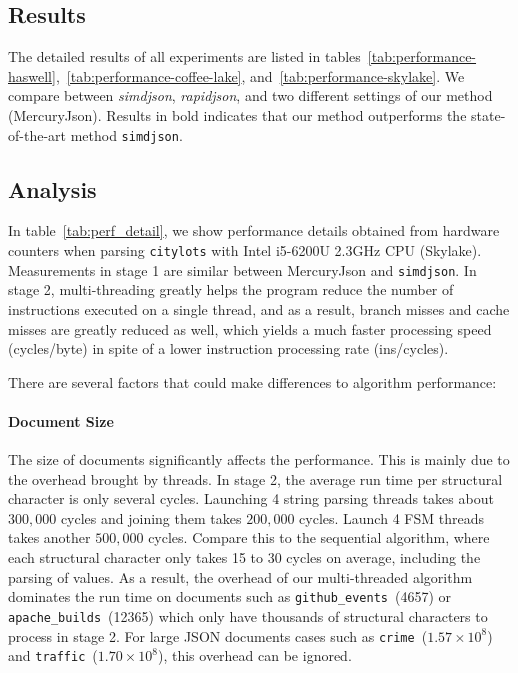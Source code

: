 \documentclass[11pt]{article}
\begin{document}
\subsection{Results}

The detailed results of all experiments are listed in tables~\ref{tab:performance-haswell},~\ref{tab:performance-coffee-lake}, and~\ref{tab:performance-skylake}. We compare between \textit{simdjson}, \textit{rapidjson}, and two different settings of our method (MercuryJson). Results in bold indicates that our method outperforms the state-of-the-art method \texttt{simdjson}.



\subsection{Analysis}

In table~\ref{tab:perf_detail}, we show performance details obtained from hardware counters when parsing \texttt{citylots} with Intel i5-6200U 2.3GHz CPU (Skylake). Measurements in stage 1 are similar between MercuryJson and \texttt{simdjson}. In stage 2, multi-threading greatly helps the program reduce the number of instructions executed on a single thread, and as a result, branch misses and cache misses are greatly reduced as well, which yields a much faster processing speed (cycles/byte) in spite of a lower instruction processing rate (ins/cycles).

There are several factors that could make differences to algorithm performance:

\paragraph{Document Size} The size of documents significantly affects the performance. This is mainly due to the overhead brought by threads. In stage 2, the average run time per structural character is only several cycles. Launching 4 string parsing threads takes about $300,000$ cycles and joining them takes $200,000$ cycles. Launch 4 FSM threads takes another $500,000$ cycles. Compare this to the sequential algorithm, where each structural character only takes 15 to 30 cycles on average, including the parsing of values. As a result, the overhead of our multi-threaded algorithm dominates the run time on documents such as \verb|github_events|~(4657) or \verb|apache_builds|~(12365) which only have thousands of structural characters to process in stage 2. For large JSON documents cases such as \texttt{crime}~($1.57\times 10^8$) and \texttt{traffic}~($1.70\times 10^8$), this overhead can be ignored.
\end{document}

